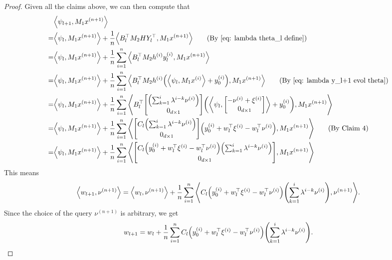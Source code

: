 \documentclass{article}
\newcommand{\explain}[1]{\tag*{(#1)}}
\newcommand{\indot}[2]{{\left<#1, #2\right>}}
\begin{document}
\begin{proof}
    Given all the claims above,
        we can then compute that
        \begin{align}
            &\indot{\psi_{l+1}}{M_1 x^{(n+1)}}\\ 
            =&\indot{\psi_l}{M_1 x^{(n+1)}} + \frac{1}{n}\indot{B_l^\top M_2 H Y_l^\top}{M_1 x^{(n+1)}} \explain{By~\eqref{eq: lambda theta_l define}}\\
            =&\indot{\psi_l}{M_1 x^{(n+1)}} + \frac{1}{n}\sum_{i=1}^n \indot{B_l^\top M_2 h^{(i)} y_l^{(i)}}{M_1 x^{(n+1)}}\\
            =&\indot{\psi_l}{M_1 x^{(n+1)}} + 
            \frac{1}{n} \sum_{i=1}^n \indot{B_l^\top M_2 h^{(i)} \qty(\indot{\psi_l}{M_1 x^{(i)}} + y_0^{(i)})}{M_1 x^{(n+1)}} \explain{By \eqref{eq: lambda y_l+1 evol theta}}\\
            =&\indot{\psi_l}{M_1 x^{(n+1)}} + 
            \frac{1}{n} \sum_{i=1}^n 
            \indot{B_l^\top \mqty[\qty(\sum_{k=1} ^i \lambda^{i-k} \nu^{(i)})\\0_{d\times 1}] 
            \qty( \indot{\psi_l}{\mqty[-\nu^{(i)} + \xi^{(i)}\\ 0_{d\times 1}]} + y_0^{(i)})}{M_1 x^{(n+1)}}\\
            =&\indot{\psi_l}{M_1 x^{(n+1)}} + 
            \frac{1}{n} \sum_{i=1}^n 
            \indot{\mqty[C_l \qty(\sum_{k=1} ^i \lambda^{i-k} \nu^{(i)})\\0_{d\times 1}] 
            \qty( y_0^{(i)} +  w_l^\top \xi^{(i)} - w_l^\top \nu^{(i)} )}{M_1 x^{(n+1)}} \explain{By Claim 4}\\
            =&\indot{\psi_l}{M_1 x^{(n+1)}} + 
            \frac{1}{n} \sum_{i=1}^n 
            \indot{\mqty[C_l \qty(y_0^{(i)} + w_l^\top \xi^{(i)} - w_l^\top \nu^{(i)})\qty(\sum_{k=1} ^i \lambda^{i-k} \nu^{(i)})\\0_{d\times 1}]}
            {M_1 x^{(n+1)}}\\
        \end{align}
        This means
        \begin{align}
            \indot{w_{l+1}}{\nu^{(n+1)}} 
            = \indot{w_l}{\nu^{(n+1)}}
            + \frac{1}{n} \sum_{i=1}^n 
            \indot{C_l \qty(y_0^{(i)} + w_l^\top \xi^{(i)} - w_l^\top \nu^{(i)})\qty(\sum_{k=1} ^i \lambda^{i-k} \nu^{(i)})}{
            \nu^{(n+1)}}.
        \end{align}
        Since the choice of the query $\nu^{(n+1)}$ is arbitrary, we get 
        \begin{align}
            w_{l+1} = w_l + \frac{1}{n}\sum_{i=1}^n C_l \qty(y_0^{(i)} + w_l^\top \xi^{(i)} - w_l^\top \nu^{(i)})\qty(\sum_{k=1} ^i \lambda^{i-k} \nu^{(i)}).
        \end{align}
    

\end{proof}
\end{document}
